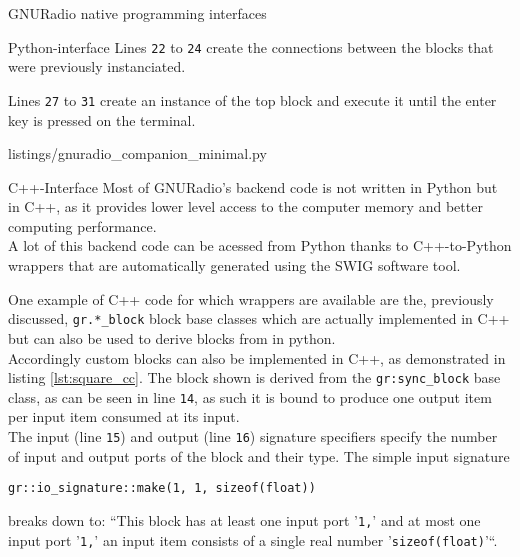 \begin{subchapter}{GNURadio native programming interfaces}
\begin{subsubchapter}{Python-interface}
    Lines \texttt{22} to \texttt{24} create the connections
    between the blocks that were previously instanciated.

    Lines \texttt{27} to \texttt{31} create an instance of the
    top block and execute it until the enter key is pressed
    on the terminal.

    
                    {listings/gnuradio_companion_minimal.py}

  \end{subsubchapter}

  \begin{subsubchapter}{C++-Interface}
    Most of GNURadio's backend code is not written in Python
    but in C++, as it provides lower level access to the computer
    memory and better computing performance. \\

    A lot of this backend code can be acessed from Python
    thanks to C++-to-Python wrappers that are automatically
    generated using the SWIG \cite{swigweb} software tool.

    One example of C++ code for which wrappers are available
    are the, previously discussed, \texttt{gr.*\_block} block
    base classes which are actually implemented in C++
    but can also be used to derive blocks from in python. \\

    Accordingly custom blocks can also be implemented in
    C++, as demonstrated in listing \ref{lst:square_cc}.
    The block shown is derived from the \texttt{gr:sync\_block}
    base class, as can be seen in line \texttt{14}, as
    such it is bound to produce one output item
    per input item consumed at its input. \\

    The input (line \texttt{15}) and output (line \texttt{16})
    signature specifiers specify the number of input and output
    ports of the block and their type.
    The simple input signature

    \begin{center}
      \texttt{gr::io\_signature::make(1, 1, sizeof(float))}
    \end{center}

    breaks down to: ``This block has at least one input port '\texttt{1,}' and
    at most one input port '\texttt{1,}' an input item consists of a single real
    number '\texttt{sizeof(float)}'``.


\end{subsubchapter}
\end{subchapter}
